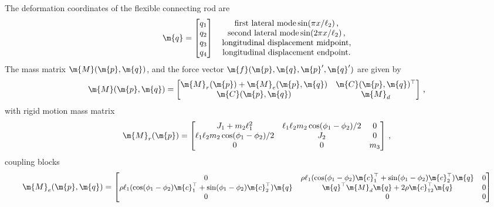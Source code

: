 %
The deformation coordinates of the flexible connecting rod are
%
\begin{equation*}
  \m{q} = \begin{bmatrix}
    q_1 \\
    q_2 \\
    q_3 \\
    q_4
  \end{bmatrix} \quad \begin{matrix}
    \text{first lateral mode} \sin(\pi x/\ell_2) \, \text{,} \\
    \text{second lateral mode} \sin(2\pi x/\ell_2) \, \text{,} \\
    \text{longitudinal displacement midpoint,} \\
    \text{longitudinal displacement endpoint.}
  \end{matrix}
\end{equation*}
%
The mass matrix $\m{M}(\m{p}, \m{q})$, and the force vector $\m{f}(\m{p}, \m{q}, \m{p}^\prime, \m{q}^\prime)$ are given by
%
\begin{equation}
  \m{M}(\m{p}, \m{q}) = \begin{bmatrix}
    \m{M}_r(\m{p}) + \m{M}_e(\m{p}, \m{q}) & \m{C}(\m{p}, \m{q})^\top \\
    \m{C}(\m{p}, \m{q})                    & \m{M}_{d}
  \end{bmatrix} \, \text{,}
\end{equation}
%
with rigid motion mass matrix
%
\begin{equation*}
  \m{M}_r(\m{p}) = \begin{bmatrix}
    J_1+m_2 \ell_1^2 & \ell_1 \ell_2 m_2 \cos(\phi_1 - \phi_2)/2 & 0 \\
    \ell_1 \ell_2 m_2 \cos(\phi_1 - \phi_2)/2 & J_2 & 0 \\
    0 & 0 & m_3
  \end{bmatrix} \, \text{,}
\end{equation*}
%
coupling blocks
%
\begin{equation*}
  \m{M}_e(\m{p}, \m{q}) = \small{\begin{bmatrix}
    0 & \rho \ell_1(\cos(\phi_1 - \phi_2)\m{c}_1^\top + \sin(\phi_1 - \phi_2)\m{c}_2^\top) \m{q} & 0 \\
    \rho \ell_1(\cos(\phi_1 - \phi_2)\m{c}_1^\top + \sin(\phi_1 - \phi_2)\m{c}_2^\top) \m{q} & \m{q}^\top\m{M}_{d}\m{q} + 2\rho\m{c}_{12}^\top\m{q} & 0 \\
    0 & 0 & 0
  \end{bmatrix}}
\end{equation*}
